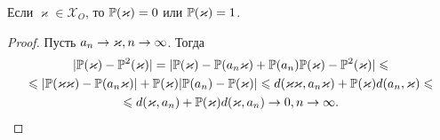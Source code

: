 \begin{theorem}
    Если $\varkappa \in \mathcal{X}_{O}$, то $\P(\varkappa) = 0$ или $\P(\varkappa) = 1$.
\end{theorem}
\begin{proof}
    Пусть $a_n \ra \varkappa, n \ra \infty$. Тогда
    \begin{multline*}
        |\P(\varkappa) - \P^2(\varkappa)| = |\P(\varkappa) - \P(a_n \varkappa) +\P(a_n)\P(\varkappa) - \P^2(\varkappa)| \leq \\ \leq  |\P(\varkappa\varkappa) - \P(a_n\varkappa)| + \P(\varkappa)|\P(a_n) - \P(\varkappa)| \leq d(\varkappa\varkappa, a_n\varkappa) + \P(\varkappa) d(a_n, \varkappa) \leq \\ \leq d(\varkappa, a_n) + \P(\varkappa) d(\varkappa, a_n) \ra 0, n \ra \infty.
    \end{multline*}
\end{proof}